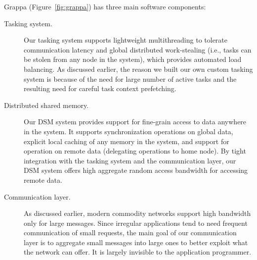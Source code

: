 Grappa (Figure~\ref{fig:grappa}) has three main software components:
\begin{description}

\item [Tasking system.] Our tasking system supports lightweight multithreading
to tolerate communication latency and global distributed work-stealing (i.e.,
tasks can be stolen from any node in the system), which provides automated
load balancing. As discussed earlier, the reason we built our own custom
tasking system is because of the need for large number of active tasks and the
resulting need for careful task context prefetching.


\item[Distributed shared memory.] Our DSM system provides support for
fine-grain access to data anywhere in the system. It supports synchronization
operations on global data, explicit local caching of any memory in the system,
and support for operation on remote data (delegating operations to home node).
By tight integration with the tasking system and the
communication layer, our DSM system offers high aggregate random
access bandwidth for accessing remote data.

\item[Communication layer.] As discussed earlier, modern commodity networks
support high bandwidth only for large messages. Since irregular applications
tend to need frequent communication of small requests, the main goal of our
communication layer is to aggregate small messages into large ones to better
exploit what the network can offer. It is largely invisible to the application
programmer.


\end{description}


